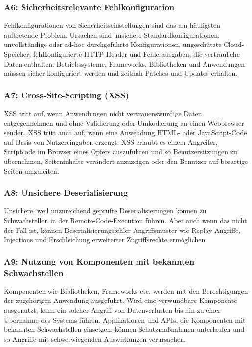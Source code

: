 \documentclass[12pt,oneside,a4paper,parskip]{scrbook}
\begin{document}
\subsubsection{A6: Sicherheitsrelevante Fehlkonfiguration}
Fehlkonfigurationen von Sicherheitseinstellungen sind das am häufigsten auftretende Problem.
Ursachen sind unsichere Standardkonfigurationen, unvollständige oder ad-hoc durchgeführte
Konfigurationen, ungeschützte Cloud-Speicher, fehlkonfigurierte HTTP-Header und Fehlerausgaben,
die vertrauliche Daten enthalten. Betriebssysteme, Frameworks, Bibliotheken und Anwendungen
müssen sicher konfiguriert werden und zeitnah Patches und Updates erhalten.

\subsubsection{A7: Cross-Site-Scripting (XSS)}
XSS tritt auf, wenn Anwendungen nicht vertrauenswürdige Daten entgegennehmen und ohne
Validierung oder Umkodierung an einen Webbrowser senden. XSS tritt auch auf, wenn eine
Anwendung HTML- oder JavaScript-Code auf Basis von Nutzereingaben erzeugt. XSS erlaubt es
einem Angreifer, Scriptcode im Browser eines Opfers auszuführen und so Benutzersitzungen zu
übernehmen, Seiteninhalte verändert anzuzeigen oder den Benutzer auf bösartige Seiten
umzuleiten.

\subsubsection{A8: Unsichere Deserialisierung}
Unsichere, weil unzureichend geprüfte Deserialisierungen können zu Schwachstellen in der
Remote-Code-Execution führen. Aber auch wenn das nicht der Fall ist, können
Deserialisierungsfehler Angriffsmuster wie Replay-Angriffe, Injections und Erschleichung
erweiterter Zugriffsrechte ermöglichen.

\subsubsection{A9: Nutzung von Komponenten mit bekannten Schwachstellen}
Komponenten wie Bibliotheken, Frameworks etc. werden mit den Berechtigungen der zugehörigen
Anwendung ausgeführt. Wird eine verwundbare Komponente ausgenutzt, kann ein solcher
Angriff von Datenverlusten bis hin zu einer Übernahme des Systems führen. Applikationen und
APIs, die Komponenten mit bekannten Schwachstellen einsetzen, können Schutzmaßnahmen
unterlaufen und so Angriffe mit schwerwiegenden Auswirkungen verursachen.
\end{document}
